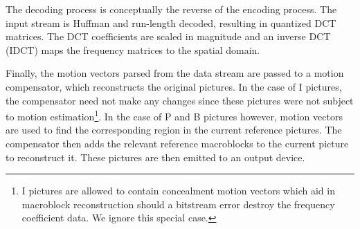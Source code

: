 
The decoding process is conceptually the reverse of the encoding
process. The input stream is Huffman and run-length decoded, resulting
in quantized DCT matrices. The DCT coefficients are scaled in
magnitude and an inverse DCT (IDCT) maps the frequency matrices to the
spatial domain.

Finally, the motion vectors parsed from the data stream are passed to
a motion compensator, which reconstructs the original pictures. In the
case of I pictures, the compensator need not make any changes since
these pictures were not subject to motion estimation\footnote{I
pictures are allowed to contain concealment motion vectors which aid in
macroblock reconstruction should a bitstream error destroy the
frequency coefficient data. We ignore this special case.}. In the case of P
and B pictures however, motion vectors are used to find the
corresponding region in the current reference pictures. The
compensator then adds the relevant reference macroblocks to the
current picture to reconstruct it. These pictures are then emitted to
an output device.